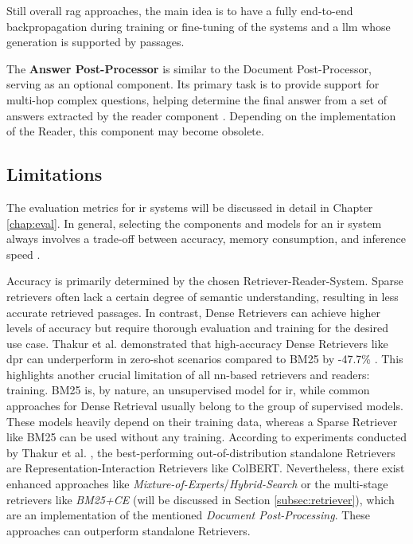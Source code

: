 Still overall \gls{rag} approaches, the main idea is to have a fully end-to-end backpropagation during training or fine-tuning of the systems and a \gls{llm} whose generation is supported by passages.

The \textbf{Answer Post-Processor} is similar to the Document Post-Processor, serving as an optional component. Its primary task is to provide support for multi-hop complex questions, helping determine the final answer from a set of answers extracted by the reader component \cite{zhu_retrieving_2021}. Depending on the implementation of the Reader, this component may become obsolete.


\subsection{Limitations}
\label{subsec:qa_limitations}

The evaluation metrics for \gls{ir} systems will be discussed in detail in Chapter \ref{chap:eval}. In general, selecting the components and models for an \gls{ir} system always involves a trade-off between accuracy, memory consumption, and inference speed \cite{zhang_survey_2023}.

Accuracy is primarily determined by the chosen Retriever-Reader-System. Sparse retrievers often lack a certain degree of semantic understanding, resulting in less accurate retrieved passages. In contrast, Dense Retrievers can achieve higher levels of accuracy but require thorough evaluation and training for the desired use case. Thakur et al. demonstrated that high-accuracy Dense Retrievers like \gls{dpr} can underperform in zero-shot scenarios compared to BM25 by -47.7\% \cite{thakur_beir_2021}. This highlights another crucial limitation of all \gls{nn}-based retrievers and readers: training. BM25 is, by nature, an unsupervised model for \gls{ir}, while common approaches for Dense Retrieval usually belong to the group of supervised models. These models heavily depend on their training data, whereas a Sparse Retriever like BM25 can be used without any training. According to experiments conducted by Thakur et al. \cite{thakur_beir_2021}, the best-performing out-of-distribution standalone Retrievers are Representation-Interaction Retrievers like ColBERT. Nevertheless, there exist enhanced approaches like \textit{Mixture-of-Experts}/\textit{Hybrid-Search}  or the multi-stage retrievers like \textit{BM25+CE} (will be discussed in Section \ref{subsec:retriever}), which are an implementation of the mentioned \textit{Document Post-Processing}. These approaches can outperform standalone Retrievers.

